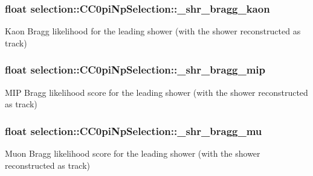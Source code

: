 \subsubsection[{\texorpdfstring{\+\_\+shr\+\_\+bragg\+\_\+kaon}{_shr_bragg_kaon}}]{\setlength{\rightskip}{0pt plus 5cm}float selection\+::\+C\+C0pi\+Np\+Selection\+::\+\_\+shr\+\_\+bragg\+\_\+kaon\hspace{0.3cm}{\ttfamily [private]}}\hypertarget{classselection_1_1CC0piNpSelection_a0fae2cdec5a695421cbe2fdfe6e61c9d}{}\label{classselection_1_1CC0piNpSelection_a0fae2cdec5a695421cbe2fdfe6e61c9d}
Kaon Bragg likelihood for the leading shower (with the shower reconstructed as track) 
\subsubsection[{\texorpdfstring{\+\_\+shr\+\_\+bragg\+\_\+mip}{_shr_bragg_mip}}]{\setlength{\rightskip}{0pt plus 5cm}float selection\+::\+C\+C0pi\+Np\+Selection\+::\+\_\+shr\+\_\+bragg\+\_\+mip\hspace{0.3cm}{\ttfamily [private]}}\hypertarget{classselection_1_1CC0piNpSelection_ae18587d33433c508bd3e371de8db7b32}{}\label{classselection_1_1CC0piNpSelection_ae18587d33433c508bd3e371de8db7b32}
M\+IP Bragg likelihood score for the leading shower (with the shower reconstructed as track) 
\subsubsection[{\texorpdfstring{\+\_\+shr\+\_\+bragg\+\_\+mu}{_shr_bragg_mu}}]{\setlength{\rightskip}{0pt plus 5cm}float selection\+::\+C\+C0pi\+Np\+Selection\+::\+\_\+shr\+\_\+bragg\+\_\+mu\hspace{0.3cm}{\ttfamily [private]}}\hypertarget{classselection_1_1CC0piNpSelection_a6ef67d022fce5058985773010161b7cb}{}\label{classselection_1_1CC0piNpSelection_a6ef67d022fce5058985773010161b7cb}
Muon Bragg likelihood score for the leading shower (with the shower reconstructed as track) 
